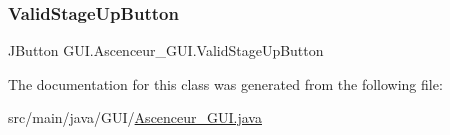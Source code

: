 \subsubsection{\texorpdfstring{ValidStageUpButton}{ValidStageUpButton}}
{\footnotesize\ttfamily J\+Button G\+U\+I.\+Ascenceur\+\_\+\+G\+U\+I.\+Valid\+Stage\+Up\+Button\hspace{0.3cm}{\ttfamily [private]}}



The documentation for this class was generated from the following file\+:\begin{DoxyCompactItemize}
\item 
src/main/java/\+G\+U\+I/\mbox{\hyperlink{_ascenceur___g_u_i_8java}{Ascenceur\+\_\+\+G\+U\+I.\+java}}\end{DoxyCompactItemize}
